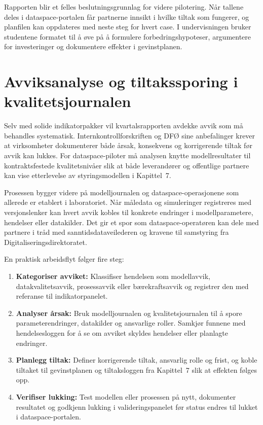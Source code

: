 Rapporten blir et felles beslutningsgrunnlag for videre pilotering. Når tallene deles i dataspace-portalen får partnerne innsikt i hvilke tiltak som fungerer, og planfilen kan oppdateres med neste steg for hvert case. I undervisningen bruker studentene formatet til å øve på å formulere forbedringshypoteser, argumentere for investeringer og dokumentere effekter i gevinstplanen.

\section{Avviksanalyse og tiltakssporing i kvalitetsjournalen}
Selv med solide indikatorpakker vil kvartalsrapporten avdekke avvik som må behandles systematisk. Internkontrollforskriften og DFØ sine anbefalinger krever at virksomheter dokumenterer både årsak, konsekvens og korrigerende tiltak før avvik kan lukkes.\citep{dfo2024internkontroll} For dataspace-piloter må analysen knytte modellresultater til kontraktsfestede kvalitetsnivåer slik at både leverandører og offentlige partnere kan vise etterlevelse av styringsmodellen i Kapittel~7.

Prosessen bygger videre på modelljournalen og dataspace-operasjonene som allerede er etablert i laboratoriet. Når måledata og simuleringer registreres med versjonslenker kan hvert avvik kobles til konkrete endringer i modellparametere, hendelser eller datakilder.\citep{digdir2023modelljournal,idsa2023operational} Det gir et spor som dataspace-operatøren kan dele med partnere i tråd med sanntidsdataveilederen og kravene til samstyring fra Digitaliseringsdirektoratet.\citep{digdir2024sanntidsdata,digdir2024samstyring}

En praktisk arbeidsflyt følger fire steg:
\begin{enumerate}
    \item \textbf{Kategoriser avviket:} Klassifiser hendelsen som modellavvik, datakvalitetsavvik, prosessavvik eller bærekraftsavvik og registrer den med referanse til indikatorpanelet.
    \item \textbf{Analyser årsak:} Bruk modelljournalen og kvalitetsjournalen til å spore parameterendringer, datakilder og ansvarlige roller. Samkjør funnene med hendelsesloggen for å se om avviket skyldes hendelser eller planlagte endringer.
    \item \textbf{Planlegg tiltak:} Definer korrigerende tiltak, ansvarlig rolle og frist, og koble tiltaket til gevinstplanen og tiltaksloggen fra Kapittel~7 slik at effekten følges opp.\citep{digdir2022gevinst}
    \item \textbf{Verifiser lukking:} Test modellen eller prosessen på nytt, dokumenter resultatet og godkjenn lukking i valideringspanelet før status endres til lukket i dataspace-portalen.
\end{enumerate}

